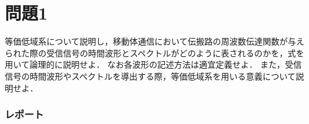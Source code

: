 \section*{問題1}
等価低域系について説明し，移動体通信において伝搬路の周波数伝達関数が与えられた際の受信信号の時間波形とスペクトルがどのように表されるのかを，式を用いて論理的に説明せよ．
なお各波形の記述方法は適宜定義せよ．
また，受信信号の時間波形やスペクトルを導出する際，等価低域系を用いる意義について説明せよ．

\subsubsection*{レポート}
\begin{comment}
等価低域系とは，複素搬送波を除いた通信システムであり，変調について検討するときなどに用いられる．
以下において等価低域系を用いる意義について示す．\par
まず現実の送受信システムについて述べる．\par
変調器によって変調されたディジタル信号を$Ae^{j\phi[k]}$とおくと，このディジタル信号はD-A変換によってアナログ信号$Ae^{j\phi(t)}$へと変換される．\par
ここで搬送波を$e^{j2\pi ft}$とおくと，送信信号$s(t)$は
\begin{eqnarray}
    s(t)&=&{\rm Re}[Ae^{j\phi(t)}e^{j2\pi ft}]\\
    &=&{\rm Re}[Ae^{j(2\pi ft+\phi(t))}]\\
    &=&{\rm Re}[A\cos{(2\pi ft+\phi(t))}+j\sin{(2\pi ft+\phi(t))}]\\
    &=&A\cos{(2\pi ft+\phi(t))}
\end{eqnarray}
とできる．\par
等価低域系においてはすべてディジタル信号なので
\end{comment}
\begin{comment}
等価低域系において，送信信号を$u(t)$，周波数伝達関数を$h(t)$とおくと，受信信号$v(t)$は
\begin{equation}
    v(t)=h(t)\otimes u(t)
\end{equation}
となる．\par
これをフーリエ変換すると，周波数スペクトル$V(f)$は
\begin{eqnarray}
    V(f)&=&\int_{-\infty}^{\infty}(h(t)\otimes u(t))e^{-j2\pi ft} dt\\
    &=&\int_{-\infty}^{\infty}\left(\int_{-\infty}^{\infty}h(\tau)u(t-\tau) d\tau\right)e^{-j2\pi ft} dt\\
    &=&\int_{-\infty}^{\infty}h(\tau)e^{-j2\pi f\tau} d\tau\bullet\int_{-\infty}^{\infty}u(t-\tau)e^{-j2\pi f(t-\tau)} dt\\
    &=&H(f)U(f)
\end{eqnarray}
とできる．
\end{comment}
